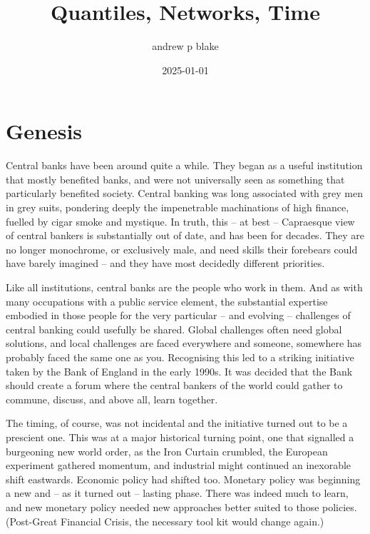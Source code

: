 \documentclass[
  letterpaper,
]{book}
\title{Quantiles, Networks, Time}
\author{andrew p blake}
\date{2025-01-01}
\renewcommand*\contentsname{Table of contents}
\newcommand\contentsname{Table of contents}
\begin{document}
\frontmatter
\maketitle
\ifdefined\Shaded\renewenvironment{Shaded}{\begin{tcolorbox}[breakable, frame hidden, interior hidden, boxrule=0pt, borderline west={3pt}{0pt}{shadecolor}, enhanced, sharp corners]}{\end{tcolorbox}}\fi

\renewcommand*\contentsname{Table of contents}
{
\setcounter{tocdepth}{2}
\tableofcontents
}
\listoffigures
\listoftables
\mainmatter
{}

\hypertarget{sec-genesis}{%
\chapter*{Genesis}\label{sec-genesis}}


Central banks have been around quite a while. They began as a useful
institution that mostly benefited banks, and were not universally seen
as something that particularly benefited society. Central banking was
long associated with grey men in grey suits, pondering deeply the
impenetrable machinations of high finance, fuelled by cigar smoke and
mystique. In truth, this -- at best -- Capraesque view of central
bankers is substantially out of date, and has been for decades. They are
no longer monochrome, or exclusively male, and need skills their
forebears could have barely imagined -- and they have most decidedly
different priorities.

Like all institutions, central banks are the people who work in them.
And as with many occupations with a public service element, the
substantial expertise embodied in those people for the very particular
-- and evolving -- challenges of central banking could usefully be
shared. Global challenges often need global solutions, and local
challenges are faced everywhere and someone, somewhere has probably
faced the same one as you. Recognising this led to a striking initiative
taken by the Bank of England in the early 1990s. It was decided that the
Bank should create a forum where the central bankers of the world could
gather to commune, discuss, and above all, learn together.

The timing, of course, was not incidental and the initiative turned out
to be a prescient one. This was at a major historical turning point, one
that signalled a burgeoning new world order, as the Iron Curtain
crumbled, the European experiment gathered momentum, and industrial
might continued an inexorable shift eastwards. Economic policy had
shifted too. Monetary policy was beginning a new and -- as it turned out
-- lasting phase. There was indeed much to learn, and new monetary
policy needed new approaches better suited to those policies.
(Post-Great Financial Crisis, the necessary tool kit would change
again.)
\end{document}
